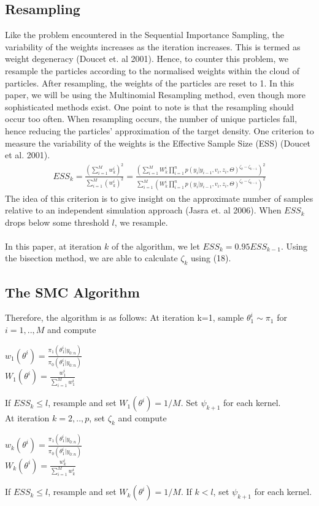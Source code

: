 \documentclass[11pt]{article}
\theoremstyle{definition}
\begin{document}
\subsection{Resampling}
Like the problem encountered in the Sequential Importance Sampling, the variability of the weights increases as the iteration increases. This is termed as weight degeneracy (Doucet et. al 2001). Hence, to counter this problem, we resample the particles according to the normalised weights within the cloud of particles. After resampling, the weights of the particles are reset to 1. In this paper, we will be using the Multinomial Resampling method, even though more sophisticated methods exist. One point to note is that the resampling should occur too often. When resampling occurs, the number of unique particles fall, hence reducing the particles' approximation of the target density. One criterion to measure the variability of the weights is the Effective Sample Size (ESS) (Doucet et al. 2001). 
\begin{equation}
	\begin{aligned}
		ESS_{k} = \frac{(\sum_{i=1}^{M} w_{k}^{i})^{2}}{\sum_{i=1}^{M} (w_{k}^{i})^{2}}=
		\frac{(\sum_{i=1}^{M} W_{k}^{i} \prod_{i=1}^{n} p(y_{i}|y_{i-1},v_{i},z_{i},\Theta)^{\zeta_{k}-\zeta_{k-1}})^{2}}{\sum_{i=1}^{M} (W_{k}^{i}\prod_{i=1}^{n} p(y_{i}|y_{i-1},v_{i},z_{i},\Theta)^{\zeta_{k}-\zeta_{k-1}})^{2}}
	\end{aligned}
\end{equation}
The idea of this criterion is to give insight on the approximate number of samples relative to an independent simulation approach (Jasra et. al 2006). When $ESS_{k}$ drops below some threshold $l$, we resample. \\
\\
\noindent In this paper, at iteration $k$ of the algorithm, we let $ESS_{k}=0.95ESS_{k-1}$. Using the bisection method, we are able to calculate $\zeta_{k}$ using (18). 

\subsection{The SMC Algorithm}
Therefore, the algorithm is as follows:
At iteration k=1, sample $\theta_{1}^{i} \sim \pi_{1}$ for $i=1,..,M$ and compute\\
\begin{center}
$w_{1}(\theta^{i}) = \frac{\pi_{1}(\theta_{1}^{i}|y_{0:n})}{\pi_{0}(\theta_{1}^{i}|y_{0:n})}$\\
$W_{1}(\theta^{i}) = \frac{w_{1}^{i}}{\sum_{i=1}^{M} w_{1}^{i}}$
\end{center}
If $ESS_{k} \leqslant l$, resample and set $W_{1}(\theta^{i}) = 1/M$. Set $\psi_{k+1}$ for each kernel. \\
\noindent At iteration $k=2,..,p$, set $\zeta_{k}$ and compute
\begin{center}
$w_{k}(\theta^{i}) = \frac{\pi_{1}(\theta_{1}^{i}|y_{0:n})}{\pi_{0}(\theta_{1}^{i}|y_{0:n})}$\\
$W_{k}(\theta^{i}) = \frac{w_{k}^{i}}{\sum_{i=1}^{M} w_{k}^{i}}$
\end{center}
If $ESS_{k} \leqslant l$, resample and set $W_{k}(\theta^{i}) = 1/M$. If $k < l$, set $\psi_{k+1}$ for each kernel.
\end{document}
